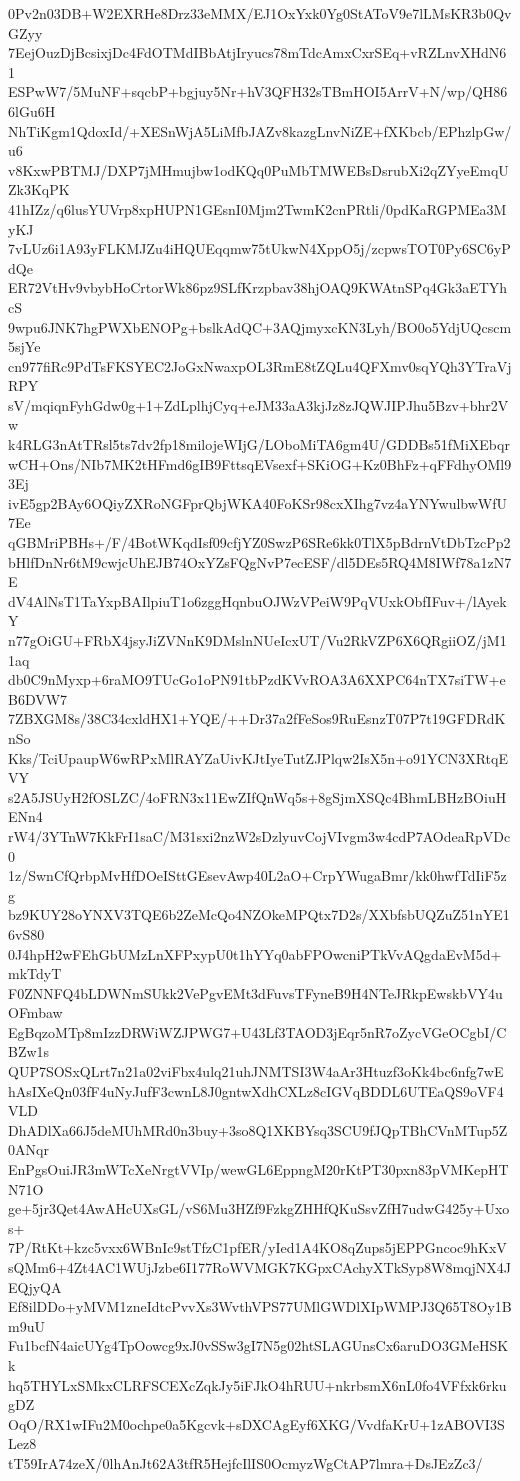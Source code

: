 0Pv2n03DB+W2EXRHe8Drz33eMMX/EJ1OxYxk0Yg0StAToV9e7lLMsKR3b0QvGZyy
7EejOuzDjBcsixjDc4FdOTMdIBbAtjIryucs78mTdcAmxCxrSEq+vRZLnvXHdN61
ESPwW7/5MuNF+sqcbP+bgjuy5Nr+hV3QFH32sTBmHOI5ArrV+N/wp/QH866lGu6H
NhTiKgm1QdoxId/+XESnWjA5LiMfbJAZv8kazgLnvNiZE+fXKbcb/EPhzlpGw/u6
v8KxwPBTMJ/DXP7jMHmujbw1odKQq0PuMbTMWEBsDsrubXi2qZYyeEmqUZk3KqPK
41hIZz/q6lusYUVrp8xpHUPN1GEsnI0Mjm2TwmK2cnPRtli/0pdKaRGPMEa3MyKJ
7vLUz6i1A93yFLKMJZu4iHQUEqqmw75tUkwN4XppO5j/zcpwsTOT0Py6SC6yPdQe
ER72VtHv9vbybHoCrtorWk86pz9SLfKrzpbav38hjOAQ9KWAtnSPq4Gk3aETYhcS
9wpu6JNK7hgPWXbENOPg+bslkAdQC+3AQjmyxcKN3Lyh/BO0o5YdjUQcscm5sjYe
cn977fiRc9PdTsFKSYEC2JoGxNwaxpOL3RmE8tZQLu4QFXmv0sqYQh3YTraVjRPY
sV/mqiqnFyhGdw0g+1+ZdLplhjCyq+eJM33aA3kjJz8zJQWJIPJhu5Bzv+bhr2Vw
k4RLG3nAtTRsl5ts7dv2fp18milojeWIjG/LOboMiTA6gm4U/GDDBs51fMiXEbqr
wCH+Ons/NIb7MK2tHFmd6gIB9FttsqEVsexf+SKiOG+Kz0BhFz+qFFdhyOMl93Ej
ivE5gp2BAy6OQiyZXRoNGFprQbjWKA40FoKSr98cxXIhg7vz4aYNYwulbwWfU7Ee
qGBMriPBHs+/F/4BotWKqdIsf09cfjYZ0SwzP6SRe6kk0TlX5pBdrnVtDbTzcPp2
bHlfDnNr6tM9cwjcUhEJB74OxYZsFQgNvP7ecESF/dl5DEs5RQ4M8IWf78a1zN7E
dV4AlNsT1TaYxpBAIlpiuT1o6zggHqnbuOJWzVPeiW9PqVUxkObfIFuv+/lAyekY
n77gOiGU+FRbX4jsyJiZVNnK9DMslnNUeIcxUT/Vu2RkVZP6X6QRgiiOZ/jM11aq
db0C9nMyxp+6raMO9TUcGo1oPN91tbPzdKVvROA3A6XXPC64nTX7siTW+eB6DVW7
7ZBXGM8s/38C34cxldHX1+YQE/++Dr37a2fFeSos9RuEsnzT07P7t19GFDRdKnSo
Kks/TciUpaupW6wRPxMlRAYZaUivKJtIyeTutZJPlqw2IsX5n+o91YCN3XRtqEVY
s2A5JSUyH2fOSLZC/4oFRN3x11EwZIfQnWq5s+8gSjmXSQc4BhmLBHzBOiuHENn4
rW4/3YTnW7KkFrI1saC/M31sxi2nzW2sDzlyuvCojVIvgm3w4cdP7AOdeaRpVDc0
1z/SwnCfQrbpMvHfDOeISttGEsevAwp40L2aO+CrpYWugaBmr/kk0hwfTdIiF5zg
bz9KUY28oYNXV3TQE6b2ZeMcQo4NZOkeMPQtx7D2s/XXbfsbUQZuZ51nYE16vS80
0J4hpH2wFEhGbUMzLnXFPxypU0t1hYYq0abFPOwcniPTkVvAQgdaEvM5d+mkTdyT
F0ZNNFQ4bLDWNmSUkk2VePgvEMt3dFuvsTFyneB9H4NTeJRkpEwskbVY4uOFmbaw
EgBqzoMTp8mIzzDRWiWZJPWG7+U43Lf3TAOD3jEqr5nR7oZycVGeOCgbI/CBZw1s
QUP7SOSxQLrt7n21a02viFbx4ulq21uhJNMTSI3W4aAr3Htuzf3oKk4bc6nfg7wE
hAsIXeQn03fF4uNyJufF3cwnL8J0gntwXdhCXLz8cIGVqBDDL6UTEaQS9oVF4VLD
DhADlXa66J5deMUhMRd0n3buy+3so8Q1XKBYsq3SCU9fJQpTBhCVnMTup5Z0ANqr
EnPgsOuiJR3mWTcXeNrgtVVIp/wewGL6EppngM20rKtPT30pxn83pVMKepHTN71O
ge+5jr3Qet4AwAHcUXsGL/vS6Mu3HZf9FzkgZHHfQKuSsvZfH7udwG425y+Uxos+
7P/RtKt+kzc5vxx6WBnIc9stTfzC1pfER/yIed1A4KO8qZups5jEPPGncoc9hKxV
sQMm6+4Zt4AC1WUjJzbe6I177RoWVMGK7KGpxCAchyXTkSyp8W8mqjNX4JEQjyQA
Ef8ilDDo+yMVM1zneIdtcPvvXs3WvthVPS77UMlGWDlXIpWMPJ3Q65T8Oy1Bm9uU
Fu1bcfN4aicUYg4TpOowcg9xJ0vSSw3gI7N5g02htSLAGUnsCx6aruDO3GMeHSKk
hq5THYLxSMkxCLRFSCEXcZqkJy5iFJkO4hRUU+nkrbsmX6nL0fo4VFfxk6rkugDZ
OqO/RX1wIFu2M0ochpe0a5Kgcvk+sDXCAgEyf6XKG/VvdfaKrU+1zABOVI3SLez8
tT59IrA74zeX/0lhAnJt62A3tfR5HejfcIlIS0OcmyzWgCtAP7lmra+DsJEzZc3/

